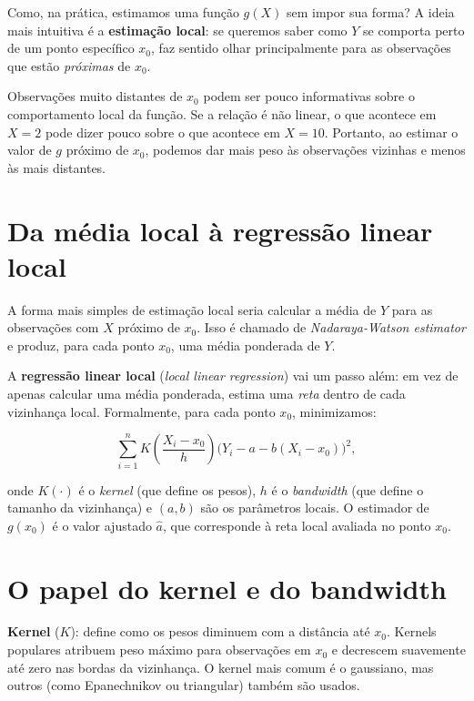 Como, na prática, estimamos uma função $g(X)$ sem impor sua forma? A ideia mais
intuitiva é a \textbf{estimação local}: se queremos saber como $Y$ se comporta perto
de um ponto específico $x_0$, faz sentido olhar principalmente para as observações
que estão \emph{próximas} de $x_0$.

Observações muito distantes de $x_0$ podem ser pouco informativas sobre o
comportamento local da função. Se a relação é não linear, o que acontece em $X = 2$
pode dizer pouco sobre o que acontece em $X = 10$. Portanto, ao estimar o valor de
$g$ próximo de $x_0$, podemos dar mais peso às observações vizinhas e menos às mais
distantes.

\section*{Da média local à regressão linear local}

A forma mais simples de estimação local seria calcular a média de $Y$ para as
observações com $X$ próximo de $x_0$. Isso é chamado de \emph{Nadaraya-Watson
estimator} e produz, para cada ponto $x_0$, uma média ponderada de $Y$.

A \textbf{regressão linear local} (\emph{local linear regression}) vai um passo além:
em vez de apenas calcular uma média ponderada, estima uma \emph{reta} dentro de cada
vizinhança local. Formalmente, para cada ponto $x_0$, minimizamos:

\begin{equation}
\sum_{i=1}^{n} K\!\left(\frac{X_i - x_0}{h}\right) \bigl(Y_i - a - b(X_i - x_0)\bigr)^2,
\label{eq:llr}
\end{equation}

\noindent
onde $K(\cdot)$ é o \emph{kernel} (que define os pesos), $h$ é o \emph{bandwidth}
(que define o tamanho da vizinhança) e $(a, b)$ são os parâmetros locais. O
estimador de $g(x_0)$ é o valor ajustado $\hat{a}$, que corresponde à reta local
avaliada no ponto $x_0$.

\section*{O papel do kernel e do bandwidth}

\textbf{Kernel} ($K$): define como os pesos diminuem com a distância até $x_0$.
Kernels populares atribuem peso máximo para observações em $x_0$ e decrescem suavemente
até zero nas bordas da vizinhança. O kernel mais comum é o gaussiano, mas outros
(como Epanechnikov ou triangular) também são usados.

